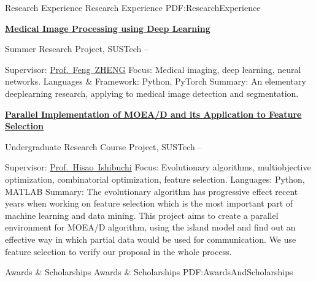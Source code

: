 \documentclass[a4paper,MMMyyyy,nonstopmode]{simpleresumecv}
\begin{document}
\begin{Body}
    \Section
    {Research Experience}
    {Research Experience}
    {PDF:ResearchExperience}

    \Entry
    \href{https://github.com/hackroid/cv-xmp}
    {\textbf{Medical Image Processing using Deep Learning}}

    \BulletItem
    Summer Research Project, SUSTech
    \hfill
     --
    \begin{Detail}
        \SubBulletItem
        Supervisor:
        \href{https://faculty.sustech.edu.cn/fengzheng/en/}{Prof.~Feng~ZHENG}
        \SubBulletItem
        Focus:
        Medical imaging, deep learning, neural networks.
        \SubBulletItem
        Languages \& Framework: Python, PyTorch
        \SubBulletItem
        Summary:
        An elementary deeplearning research, applying to medical image detection and segmentation.
    \end{Detail}

    \Entry
    \href{https://github.com/hackroid/pMOEA-D}
    {\textbf{Parallel Implementation of MOEA/D and its Application to Feature Selection}}

    \Gap
    \BulletItem
    Undergraduate Research Course Project, SUSTech
    \hfill
     --
    \begin{Detail}
        \SubBulletItem
        Supervisor:
        \href{http://cse.sustech.edu.cn/faculty/~hisao/}{Prof.~Hisao~Ishibuchi}
        \SubBulletItem
        Focus:
        Evolutionary algorithms, multiobjective optimization, combinatorial optimization, feature selection.
        \SubBulletItem
        Languages: Python, MATLAB
        \SubBulletItem
        Summary:
        The evolutionary algorithm has progressive effect recent years when working on feature selection which is the most important part of machine learning and data mining. This project aims to create a parallel environment for MOEA/D algorithm, using the island model and find out an effective way in which partial data would be used for communication. We use feature selection to verify our proposal in the whole process.
    \end{Detail}



    \Section
    {Awards \&\newline
        Scholarships}
    {Awards \& Scholarships}
    {PDF:AwardsAndScholarships}


\end{Body}
\end{document}
